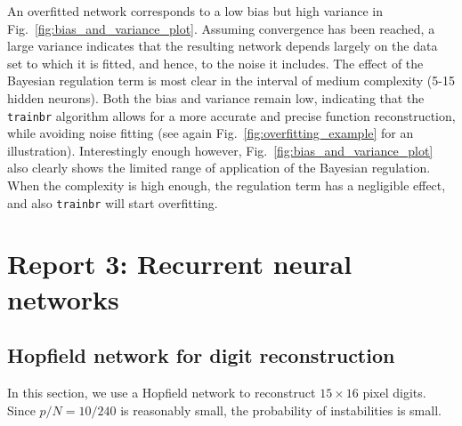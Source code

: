 \documentclass[pdftex,11pt,a4paper]{article}
\begin{document}
An overfitted network corresponds to a low bias but high variance in Fig.~\ref{fig:bias_and_variance_plot}. Assuming convergence has been reached, a large variance indicates that the resulting network depends largely on the data set to which it is fitted, and hence, to the noise it includes. The effect of the Bayesian regulation term is most clear in the interval of medium complexity (5-15 hidden neurons). Both the bias and variance remain low, indicating that the \texttt{trainbr} algorithm allows for a more accurate and precise function reconstruction, while avoiding noise fitting (see again Fig.~\ref{fig:overfitting_example} for an illustration). Interestingly enough however, Fig.~\ref{fig:bias_and_variance_plot} also clearly shows the limited range of application of the Bayesian regulation. When the complexity is high enough, the regulation term has a negligible effect, and also \texttt{trainbr} will start overfitting.



\section{Report 3: Recurrent neural networks}
\subsection{Hopfield network for digit reconstruction}
In this section, we use a Hopfield network to reconstruct $15 \times 16$ pixel digits. Since $p/N = 10/240$ is reasonably small, the probability of instabilities is small.
\end{document}
